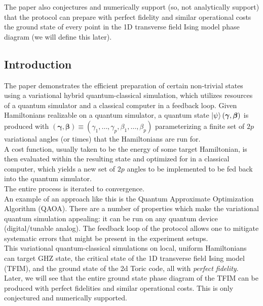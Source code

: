 \documentclass{book}
\theoremstyle{definition}
\begin{document}
The paper also conjectures and numerically support (so, not analytically support) that the protocol can prepare with perfect fidelity and similar operational costs the ground state of every point in the 1D transverse field Ising model phase diagram (we will define this later). 




\subsection{Introduction}



The paper demonstrates the efficient preparation of certain non-trivial states using a variational hybrid quantum-classical simulation, which utilizes resources of a quantum simulator and a classical computer in a feedback loop. Given Hamiltonians realizable on a quantum simulator, a quantum state $\ket{\psi}(\bm{\gamma}, \bm{\beta})$ is produced with $(\bm{\gamma}, \bm\beta) \equiv (\gamma_1,\dots,\gamma_p, \beta_1,\dots,\beta_p)$ parameterizing a finite set of $2p$ variational angles (or times) that the Hamiltonians are run for. \\

A cost function, usually taken to be the energy of some target Hamiltonian, is then evaluated within the resulting state and optimized for in a classical computer, which yields a new set of $2p$ angles to be implemented to be fed back into the quantum simulator. \\

The entire process is iterated to convergence. \\


An example of an approach like this is the Quantum Approximate Optimization Algorithm (QAOA). There are a number of properties which make the variational quantum simulation appealing: it can be run on any quantum device (digital/tunable analog). The feedback loop of the protocol allows one to mitigate systematic errors that might be present in the experiment setups. \\

This variational quantum-classical simulations on local, uniform Hamiltonians can target GHZ state, the critical state of the 1D transverse field Ising model (TFIM), and the ground state of the 2d Toric code, all with \textit{perfect fidelity}. \\

Later, we will see that the entire ground state phase diagram of the TFIM can be produced with perfect fidelities and similar operational costs. This is only conjectured and numerically supported. \\
\end{document}
